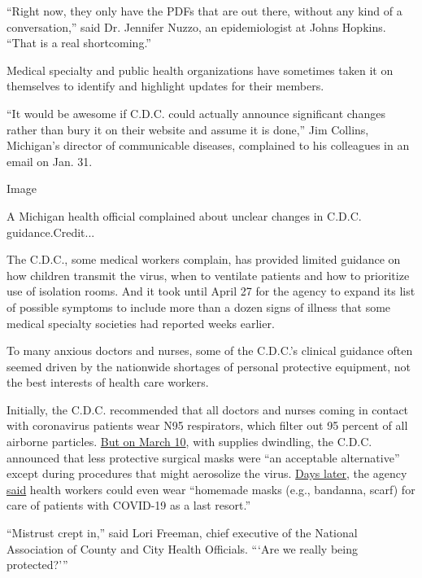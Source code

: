 ``Right now, they only have the PDFs that are out there, without any
kind of a conversation,'' said Dr. Jennifer Nuzzo, an epidemiologist at
Johns Hopkins. ``That is a real shortcoming.''

Medical specialty and public health organizations have sometimes taken
it on themselves to identify and highlight updates for their members.

``It would be awesome if C.D.C. could actually announce significant
changes rather than bury it on their website and assume it is done,''
Jim Collins, Michigan's director of communicable diseases, complained to
his colleagues in an email on Jan. 31.

Image

A Michigan health official complained about unclear changes in C.D.C.
guidance.Credit...

The C.D.C., some medical workers complain, has provided limited guidance
on how children transmit the virus, when to ventilate patients and how
to prioritize use of isolation rooms. And it took until April 27 for the
agency to expand its list of possible symptoms to include more than a
dozen signs of illness that some medical specialty societies had
reported weeks earlier.

To many anxious doctors and nurses, some of the C.D.C.'s clinical
guidance often seemed driven by the nationwide shortages of personal
protective equipment, not the best interests of health care workers.

Initially, the C.D.C. recommended that all doctors and nurses coming in
contact with coronavirus patients wear N95 respirators, which filter out
95 percent of all airborne particles.
\href{https://www.washingtonpost.com/health/2020/03/10/face-mask-shortage-prompts-cdc-loosen-coronavirus-guidance/}{But
on March 10}, with supplies dwindling, the C.D.C. announced that less
protective surgical masks were ``an acceptable alternative'' except
during procedures that might aerosolize the virus.
\href{https://www.latimes.com/politics/story/2020-03-21/coronavirus-mask-bandanna-covid-19-bandanna}{Days
later}, the agency
\href{https://www.cdc.gov/coronavirus/2019-ncov/hcp/ppe-strategy/face-masks.html}{said}
health workers could even wear ``homemade masks (e.g., bandanna, scarf)
for care of patients with COVID-19 as a last resort.''

``Mistrust crept in,'' said Lori Freeman, chief executive of the
National Association of County and City Health Officials. ```Are we
really being protected?'''

